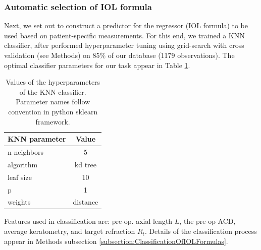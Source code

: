 \documentclass[article,twocolumn,preprint,10pt]{paper}%
\renewcommand{\(}{\left(}
\renewcommand{\)}{\right)}
\renewcommand{\[}{\left[}
\renewcommand{\]}{\right]}
\newcommand{\1}{\mbox{\boldmath$1$}}
\begin{document}
\subsubsection{Automatic selection of IOL formula}\label{subsection:AutomaticSelectionOfIOLFormula}
Next, we set out to construct a predictor for the regressor (IOL formula) to be used based on patient-specific measurements. For this end, we trained a KNN classifier, after performed hyperparameter tuning using grid-search with cross validation (see Methods) on 85\% of our database (1179 observations). The optimal classifier parameters for our task appear in Table \ref{table:KNNparameters}.
\begin{table}
	\begin{tabular}{l|c}
		KNN parameter  & Value\\
		\hline 
		\hline 
		n neighbors & 5 \\
		algorithm  & kd tree\\
		leaf size   & 10 \\
		p    & 1\\
		weights & distance
	\end{tabular} 
  \caption{Values of the hyperparameters of the KNN classifier. Parameter names follow convention in python sklearn framework.}
  \label{table:KNNparameters}
\end{table}
Features used in classification are: pre-op. axial length $L$, the pre-op ACD, average keratometry, and target refraction $R_t$. Details of the classification process appear in Methods subsection \ref{subsection:ClassificationOfIOLFormulas}. 
\end{document}
